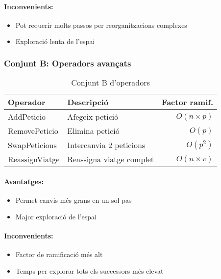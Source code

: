 \paragraph{Inconvenients:}
\begin{itemize}
    \item Pot requerir molts passos per reorganitzacions complexes
    \item Exploració lenta de l'espai
\end{itemize}

\subsubsection{Conjunt B: Operadors avançats}

\begin{table}[H]
\centering
\begin{tabular}{@{}llr@{}}
\toprule
\textbf{Operador} & \textbf{Descripció} & \textbf{Factor ramif.} \\
\midrule
AddPeticio & Afegeix petició & $O(n \times p)$ \\
RemovePeticio & Elimina petició & $O(p)$ \\
SwapPeticions & Intercanvia 2 peticions & $O(p^2)$ \\
ReassignViatge & Reassigna viatge complet & $O(n \times v)$ \\
\bottomrule
\end{tabular}
\caption{Conjunt B d'operadors}
\label{tab:operators-b}
\end{table}

\paragraph{Avantatges:}
\begin{itemize}
    \item Permet canvis més grans en un sol pas
    \item Major exploració de l'espai
\end{itemize}

\paragraph{Inconvenients:}
\begin{itemize}
    \item Factor de ramificació més alt
    \item Temps per explorar tots els successors més elevat
\end{itemize}

